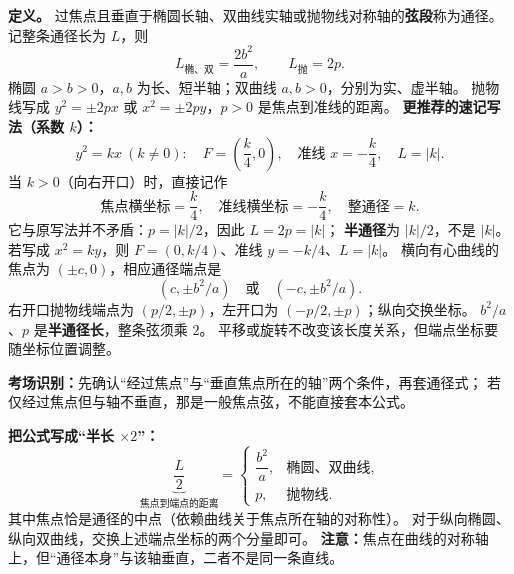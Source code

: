 \begin{statementbox}
\textbf{定义。} 过焦点且垂直于椭圆长轴、双曲线实轴或抛物线对称轴的\textbf{弦段}称为通径。
记整条通径长为 $L$，则
\[
 \boxed{L_{\text{椭、双}}=\frac{2b^2}{a}},\qquad
 \boxed{L_{\text{抛}}=2p}.
\]
椭圆 $a>b>0$，$a,b$ 为长、短半轴；双曲线 $a,b>0$，分别为实、虚半轴。
抛物线写成 $y^2=\pm2px$ 或 $x^2=\pm2py$，$p>0$ 是焦点到准线的距离。
\medskip
\textbf{更推荐的速记写法（系数 $k$）：}
\[
 \boxed{y^2=kx\ (k\ne0):\quad
 F=\left(\frac{k}{4},0\right),\quad
 \text{准线 }x=-\frac{k}{4},\quad
 L=|k|.}
\]
当 $k>0$（向右开口）时，直接记作
\[
 \boxed{\text{焦点横坐标}=\frac{k}{4},\quad
 \text{准线横坐标}=-\frac{k}{4},\quad
 \text{整通径}=k.}
\]
它与原写法并不矛盾：$p=|k|/2$，因此 $L=2p=|k|$；
\textbf{半通径}为 $|k|/2$，不是 $|k|$。
若写成 $x^2=ky$，则 $F=(0,k/4)$、准线 $y=-k/4$、$L=|k|$。
横向有心曲线的焦点为 $(\pm c,0)$，相应通径端点是
\[
 (c,\pm b^2/a)\quad\text{或}\quad(-c,\pm b^2/a).
\]
右开口抛物线端点为 $(p/2,\pm p)$，左开口为 $(-p/2,\pm p)$；纵向交换坐标。
$b^2/a$、$p$ 是\textbf{半通径长}，整条弦须乘 $2$。
平移或旋转不改变该长度关系，但端点坐标要随坐标位置调整。


\medskip
\textbf{考场识别：}先确认“经过焦点”与“垂直焦点所在的轴”两个条件，再套通径式；
若仅经过焦点但与轴不垂直，那是一般焦点弦，不能直接套本公式。

\textbf{把公式写成“半长 $\times2$”：}
\[
 \underbrace{\frac{L}{2}}_{\text{焦点到端点的距离}}
 =\begin{cases}
 \dfrac{b^2}{a},&\text{椭圆、双曲线},\\[2pt]
 p,&\text{抛物线}.
 \end{cases}
\]
其中焦点恰是通径的中点（依赖曲线关于焦点所在轴的对称性）。
对于纵向椭圆、纵向双曲线，交换上述端点坐标的两个分量即可。
\textbf{注意：}焦点在曲线的对称轴上，但“通径本身”与该轴垂直，二者不是同一条直线。

\end{statementbox}
